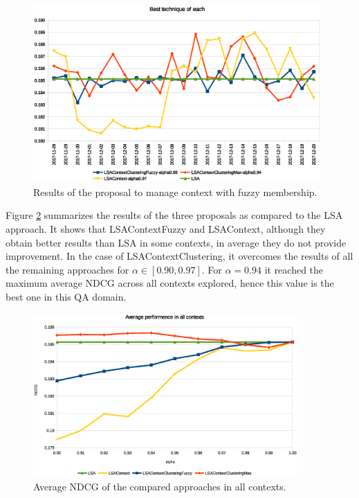 \documentclass[preprint]{elsarticle}
\begin{document}
\begin{spacing}{1.5}
\begin{figure}[htb]
    \centering
    \includegraphics[width=0.98\textwidth]{figures/ndcg-results-3proposals-bests-per-day.eps}
    \caption{Results of the proposal to manage context with fuzzy membership.}
    \label{fig:ndcg-results-3proposals-bests-per-day}
\end{figure}

Figure \ref{fig:ndcg-results-3proposals-average} summarizes the results of the three proposals as compared to the LSA approach. It shows that LSAContextFuzzy and LSAContext, although they obtain better results than LSA in some contexts, in average they do not provide improvement. In the case of LSAContextClustering, it overcomes the results of all the remaining approaches for $\alpha \in [0.90,0.97]$. For $\alpha=0.94$ it reached the maximum average NDCG across all contexts explored, hence this value is the best one in this QA domain.

\begin{figure}[htb]
    \centering
    \includegraphics[width=0.9\textwidth]{figures/ndcg-results-3proposals-average.eps}
    \caption{Average NDCG of the compared approaches in all contexts.}
    \label{fig:ndcg-results-3proposals-average}
\end{figure}


\end{spacing}
\end{document}

